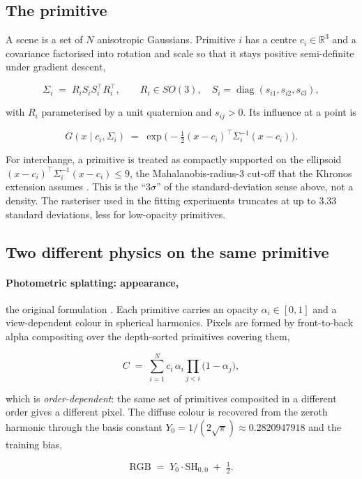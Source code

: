 \documentclass[11pt,a4paper]{article}
\begin{document}
\subsection{The primitive}

A scene is a set of $N$ anisotropic Gaussians. Primitive $i$ has a centre
$c_i \in \mathbb{R}^3$ and a covariance factorised into rotation and scale so that it stays
positive semi-definite under gradient descent,

\[
  \Sigma_i \;=\; R_i S_i S_i^{\!\top} R_i^{\!\top},
  \qquad R_i \in SO(3), \quad S_i = \operatorname{diag}(s_{i1}, s_{i2}, s_{i3}),
\]

with $R_i$ parameterised by a unit quaternion and $s_{ij} > 0$. Its influence at a point is

\[
  G(x \mid c_i, \Sigma_i) \;=\;
  \exp\!\Big( -\tfrac{1}{2} (x - c_i)^{\!\top} \Sigma_i^{-1} (x - c_i) \Big).
\]

For interchange, a primitive is treated as compactly supported on the ellipsoid
$(x-c_i)^\top \Sigma_i^{-1}(x-c_i) \le 9$, the Mahalanobis-radius-3 cut-off that the Khronos
extension assumes \cite{khrgs}. This is the ``$3\sigma$'' of the standard-deviation sense
above, not a density. The rasteriser used in the fitting experiments truncates at up to 3.33
standard deviations, less for low-opacity primitives.

\subsection{Two different physics on the same primitive}

\paragraph{Photometric splatting: appearance,} the original formulation \cite{kerbl2023}.
Each primitive carries an opacity $\alpha_i \in [0,1]$ and a view-dependent colour in
spherical harmonics. Pixels are formed by front-to-back alpha compositing over the
depth-sorted primitives covering them,

\[
  C \;=\; \sum_{i=1}^{N} c_i \, \alpha_i \prod_{j<i} \big(1 - \alpha_j\big),
\]

which is \emph{order-dependent}: the same set of primitives composited in a different order
gives a different pixel. The diffuse colour is recovered from the zeroth harmonic through
the basis constant $Y_0 = 1/(2\sqrt{\pi}) \approx 0.2820947918$ and the training bias,

\[
  \mathrm{RGB} \;=\; Y_0 \cdot \mathrm{SH}_{0,0} \;+\; \tfrac{1}{2}.
\]
\end{document}
